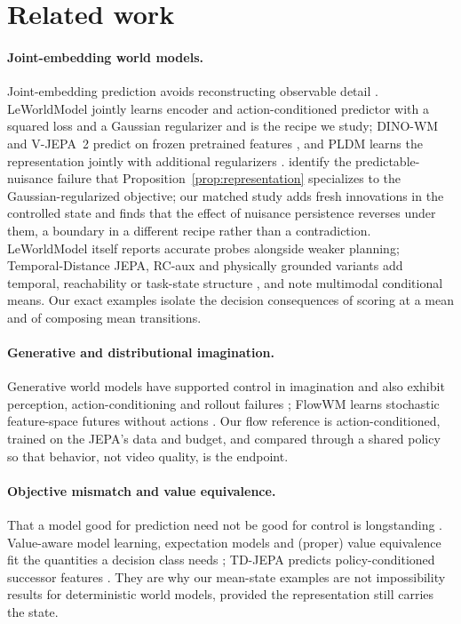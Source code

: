 \section{Related work}
\label{sec:related}

\paragraph{Joint-embedding world models.}
Joint-embedding prediction avoids reconstructing observable detail
\citep{assran2023ijepa,bardes2024vjepa}. LeWorldModel jointly learns encoder and action-conditioned
predictor with a squared loss and a Gaussian regularizer \citep{maes2026lewm,balestriero2025lejepa}
and is the recipe we study; DINO-WM and V-JEPA~2 predict on frozen pretrained features
\citep{zhou2024dinowm,assran2025vjepa2}, and PLDM learns the representation jointly with additional
regularizers \citep{sobal2025pldm}. \citet{sobal2022slow} identify the predictable-nuisance failure
that Proposition~\ref{prop:representation} specializes to the Gaussian-regularized objective; our
matched study adds fresh innovations in the controlled state and finds that the effect of nuisance
persistence reverses under them, a boundary in a different recipe rather than a contradiction.
LeWorldModel itself reports accurate probes alongside weaker planning; Temporal-Distance JEPA,
RC-aux and physically grounded variants add temporal, reachability or task-state structure
\citep{bai2026temporal,li2026rcaux,yan2026psgjepa,liu2026physicallygrounded}, and
\citet{terver2026planning} note multimodal conditional means. Our exact examples isolate the
decision consequences of scoring at a mean and of composing mean transitions.

\paragraph{Generative and distributional imagination.}
Generative world models have supported control in imagination
\citep{hafner2020dreamer,alonso2024diamond,hafner2025dreamer4} and also exhibit perception,
action-conditioning and rollout failures \citep{hansen2026hallucination}; FlowWM learns stochastic
feature-space futures without actions \citep{porcher2026flowwm}. Our flow reference is
action-conditioned, trained on the JEPA's data and budget, and compared through a shared policy so
that behavior, not video quality, is the endpoint.

\paragraph{Objective mismatch and value equivalence.}
That a model good for prediction need not be good for control is longstanding
\citep{lambert2020objective}. Value-aware model learning, expectation models and (proper) value
equivalence fit the quantities a decision class needs
\citep{farahmand2017vaml,wan2019expectation,grimm2020value,grimm2021proper}; TD-JEPA predicts
policy-conditioned successor features \citep{bagatella2026tdjepa}. They are why our mean-state
examples are not impossibility results for deterministic world models, provided the representation
still carries the state.
